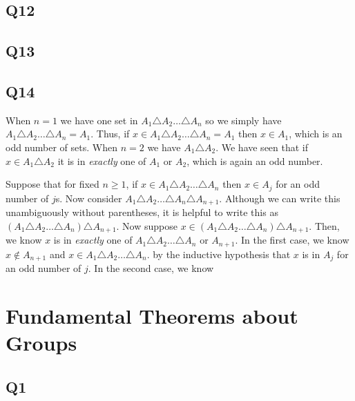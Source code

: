 \documentclass[12pt]{article}
\numberwithin{theorem}{section}
\numberwithin{equation}{section}
\numberwithin{remark}{section}
\numberwithin{definition}{section}
\numberwithin{theorem}{section}
\numberwithin{lemma}{section}
\numberwithin{example}{section}
\begin{document}
\subsection{Q12}

\subsection{Q13}

\subsection{Q14}

When $n=1$ we have one set in $A_1\triangle A_2\ldots \triangle A_n$ so we simply have $A_1\triangle A_2\ldots \triangle A_n=A_1$. Thus, if $x\in A_1\triangle A_2\ldots \triangle A_n=A_1$ then $x\in A_1$, which is an odd number of sets. When $n=2$ we have $A_1\triangle A_2$. We have seen that if $x\in A_1\triangle A_2$ it is in \emph{exactly} one of $A_1$ or $A_2$, which is again an odd number.

Suppose that for fixed $n\ge 1$, if $x\in A_1\triangle A_2\ldots \triangle A_n$ then $x\in A_j$ for an odd number of $j$s. Now consider $A_1\triangle A_2\ldots \triangle A_n\triangle A_{n+1}$. Although we can write this unambiguously without parentheses, it is helpful to write this as $(A_1\triangle A_2\ldots \triangle A_n) \triangle A_{n+1}$. Now suppose $x\in(A_1\triangle A_2\ldots \triangle A_n) \triangle A_{n+1}$. Then, we know $x$ is in \emph{exactly} one of $A_1\triangle A_2\ldots \triangle A_n$ or $A_{n+1}$. In the first case, we know $x\notin A_{n+1}$ and $x\in A_1\triangle A_2\ldots \triangle A_n$. by the inductive hypothesis that $x$ is in $A_j$ for an odd number of $j$. In the second case, we know 





\newpage

\section{Fundamental Theorems about Groups}

\subsection{Q1}
\end{document}
